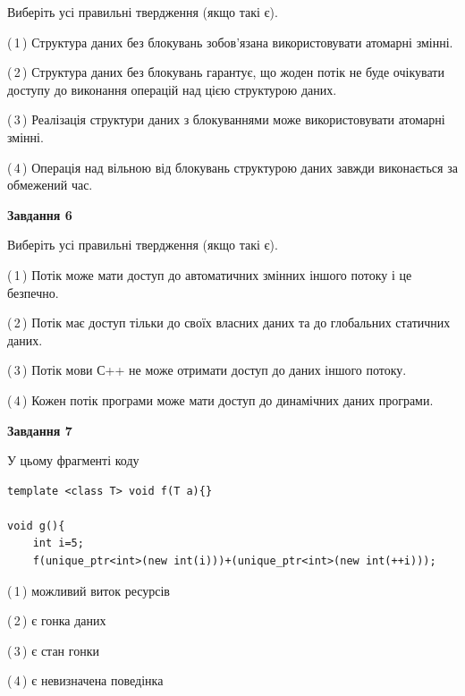 \documentclass[12pt, ukrainian]{article}
\begin{document}
\begin {large}
{Виберіть усі правильні твердження (якщо такі є).\par
\vspace{2mm}

(\,1\,) Структура даних без блокувань зобов’язана використовувати атомарні змінні.%

(\,2\,) Структура даних без блокувань гарантує, що жоден потік не буде очікувати доступу до виконання операцій над цією структурою даних.%

(\,3\,) Реалізація структури даних з блокуваннями може використовувати атомарні змінні.%

(\,4\,) Операція над вільною від блокувань структурою даних завжди виконається за обмежений час.%
\newpage


\begin{center}
\textbf{Завдання 6}
\end{center}

Виберіть усі правильні твердження (якщо такі є).\par
\vspace{2mm}

(\,1\,) Потік може мати доступ до автоматичних змінних іншого потоку і це безпечно.%

(\,2\,) Потік має доступ тільки до своїх власних даних та до глобальних статичних даних.%

(\,3\,) Потік мови С++ не може отримати доступ до даних іншого потоку.%

(\,4\,) Кожен потік програми може мати доступ до динамічних даних програми.%


\begin{center}
\textbf{Завдання 7}
\end{center}

У цьому фрагменті коду
\begin{verbatim}
template <class T> void f(T a){}

void g(){
    int i=5;
    f(unique_ptr<int>(new int(i)))+(unique_ptr<int>(new int(++i)));
\end{verbatim}
(\,1\,) можливий виток ресурсів%

(\,2\,) є гонка даних%

(\,3\,) є стан гонки%

(\,4\,) є невизначена поведінка%

}
\end {large}

\vspace{4mm}
\newpage
\end{document}

